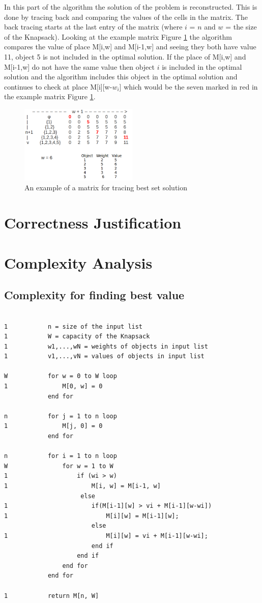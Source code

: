 \documentclass{inc/mas}
\begin{document}
In this part of the algorithm the solution of the problem is reconstructed. This is done by tracing back and comparing the values of the cells in the  matrix. The back tracing starts at the last entry of the matrix (where $i$ = $n$ and $w$ = the size of the Knapsack). Looking at the example matrix Figure \ref{marked_matrix} the algorithm compares the value of place M[i,w] and M[i-1,w] and seeing they both have value 11, object 5 is not included in the optimal solution. If the place of M[i,w] and M[i-1,w] do not have the same value then object $i$ is included in the optimal solution and the algorithm includes this object in the optimal solution and continues to check at place M[i][w-$w_i$] which would be the seven marked in red in the example matrix Figure \ref{marked_matrix}.\\



\begin{figure}[h!]
  \centering
      \includegraphics[width=0.5\textwidth]{marked_matrix.png}
  \caption{An example of a matrix for tracing best set solution }
  \label{marked_matrix}
\end{figure}


\section{Correctness Justification}


\section{Complexity Analysis}
\subsection{Complexity for finding best value}

\begin{lstlisting}

1			n = size of the input list
1			W = capacity of the Knapsack
1			w1,...,wN = weights of objects in input list
1			v1,...,vN = values of objects in input list

W			for w = 0 to W loop
1				M[0, w] = 0
			end for

n			for j = 1 to n loop
1				M[j, 0] = 0
			end for

n			for i = 1 to n loop
W				for w = 1 to W
1					if (wi > w)
1						M[i, w] = M[i-1, w]
					 else
1						if(M[i-1][w] > vi + M[i-1][w-wi])
1							M[i][w] = M[i-1][w];						
						else
1							M[i][w] = vi + M[i-1][w-wi];
						end if
					end if
				end for
			end for

1			return M[n, W]

\end{lstlisting}
\end{document}

